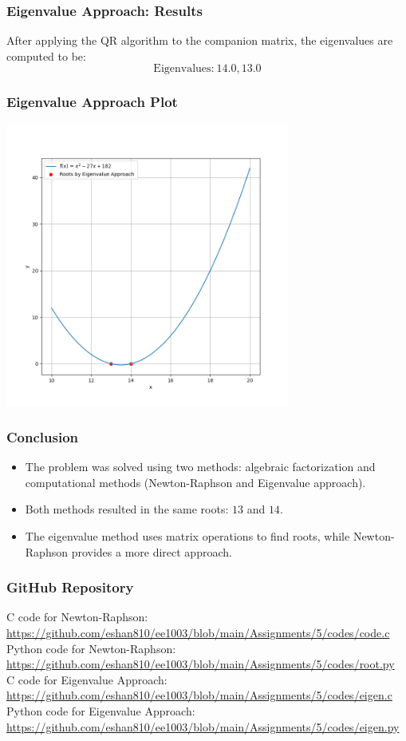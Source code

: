 \documentclass{beamer}
\theoremstyle{remark}
\begin{document}
\begin{frame}
    \frametitle{Eigenvalue Approach: Results}
    After applying the QR algorithm to the companion matrix, the eigenvalues are computed to be:
    \[
    \text{Eigenvalues:} \ 14.0, 13.0
    \]
 \end{frame}
 \begin{frame}
 \frametitle{Eigenvalue Approach Plot}
     \begin{center}
   \includegraphics[width=0.7\textwidth]{plots/plot2.png}
    \end{center}
\end{frame}

\begin{frame}
    \frametitle{Conclusion}
    \begin{itemize}
        \item The problem was solved using two methods: algebraic factorization and computational methods (Newton-Raphson and Eigenvalue approach).
        \item Both methods resulted in the same roots: \( 13 \) and \( 14 \).
        \item The eigenvalue method uses matrix operations to find roots, while Newton-Raphson provides a more direct approach.
    \end{itemize}
\end{frame}
\begin{frame}
    \frametitle{GitHub Repository}
   C code for Newton-Raphson:\\
    \url{https://github.com/eshan810/ee1003/blob/main/Assignments/5/codes/code.c} \\
    Python code for Newton-Raphson:\\
    \url{https://github.com/eshan810/ee1003/blob/main/Assignments/5/codes/root.py} \\
    C code for Eigenvalue Approach:\\
    \url{https://github.com/eshan810/ee1003/blob/main/Assignments/5/codes/eigen.c} \\
    Python code for Eigenvalue Approach:\\
    \url{https://github.com/eshan810/ee1003/blob/main/Assignments/5/codes/eigen.py}
    
\end{frame}
\end{document}
